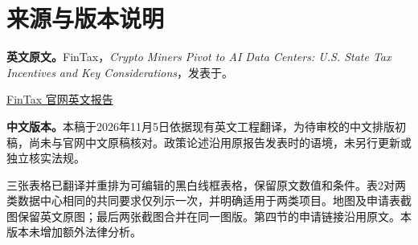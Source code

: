 \section*{来源与版本说明}
{}
\noindent\textbf{英文原文。}FinTax，\textit{Crypto Miners Pivot to AI Data Centers:
U.S. State Tax Incentives and Key Considerations}，发表于\ReportDate。\par
\medskip
\noindent\href{\ReportURL}{FinTax 官网英文报告}\par
\medskip
\noindent\textbf{中文版本。}本稿于2026年11月5日依据现有英文工程翻译，为待审校的中文排版初稿，尚未与官网中文原稿核对。政策论述沿用原报告发表时的语境，未另行更新或独立核实法规。\par
\medskip
\noindent 三张表格已翻译并重排为可编辑的黑白线框表格，保留原文数值和条件。表2对两类数据中心相同的共同要求仅列示一次，并明确适用于两类项目。地图及申请表截图保留英文原图；最后两张截图合并在同一图版。第四节的申请链接沿用原文。本版本未增加额外法律分析。
